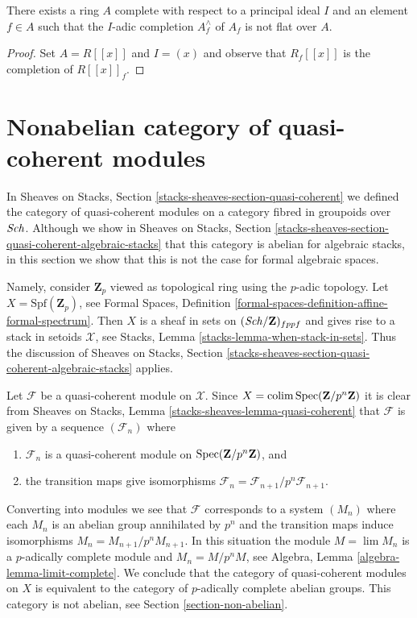 \begin{lemma}
\label{lemma-nonflat-completion-localization}
There exists a ring $A$ complete with respect to a principal ideal $I$
and an element $f \in A$ such that the $I$-adic completion
$A_f^\wedge$ of $A_f$ is not flat over $A$.
\end{lemma}

\begin{proof}
Set $A = R[[x]]$ and $I = (x)$ and observe that $R_f[[x]]$
is the completion of $R[[x]]_f$.
\end{proof}





\section{Nonabelian category of quasi-coherent modules}
\label{section-nonabelian-QCoh}

\noindent
In Sheaves on Stacks, Section \ref{stacks-sheaves-section-quasi-coherent}
we defined the category of quasi-coherent modules on a category fibred in
groupoids over $\mathit{Sch}$. Although we show in
Sheaves on Stacks, Section
\ref{stacks-sheaves-section-quasi-coherent-algebraic-stacks}
that this category is abelian for algebraic stacks, in this
section we show that this is not the case for formal algebraic spaces.

\medskip\noindent
Namely, consider $\mathbf{Z}_p$ viewed as topological ring using
the $p$-adic topology. Let $X = \text{Spf}(\mathbf{Z}_p)$, see
Formal Spaces, Definition
\ref{formal-spaces-definition-affine-formal-spectrum}.
Then $X$ is a sheaf in sets on $(\mathit{Sch}/\mathbf{Z})_{fppf}$
and gives rise to a stack in setoids $\mathcal{X}$, see 
Stacks, Lemma \ref{stacks-lemma-when-stack-in-sets}.
Thus the discussion of Sheaves on Stacks, Section
\ref{stacks-sheaves-section-quasi-coherent-algebraic-stacks}
applies. 

\medskip\noindent
Let $\mathcal{F}$ be a quasi-coherent module on $\mathcal{X}$.
Since $X = \mathop{\mathrm{colim}}\nolimits \mathop{\mathrm{Spec}}(\mathbf{Z}/p^n\mathbf{Z})$ it is clear from
Sheaves on Stacks, Lemma \ref{stacks-sheaves-lemma-quasi-coherent}
that $\mathcal{F}$ is given by a sequence $(\mathcal{F}_n)$ where
\begin{enumerate}
\item $\mathcal{F}_n$ is a quasi-coherent module on
$\mathop{\mathrm{Spec}}(\mathbf{Z}/p^n\mathbf{Z})$, and
\item the transition maps give isomorphisms
$\mathcal{F}_n = \mathcal{F}_{n + 1}/p^n\mathcal{F}_{n + 1}$.
\end{enumerate}
Converting into modules we see that $\mathcal{F}$ corresponds to a
system $(M_n)$ where each $M_n$ is an abelian group annihilated
by $p^n$ and the transition maps induce isomorphisms
$M_n = M_{n + 1}/p^n M_{n + 1}$. In this situation the module
$M = \lim M_n$ is a $p$-adically complete module and $M_n = M/p^n M$, see
Algebra, Lemma \ref{algebra-lemma-limit-complete}.
We conclude that the category of quasi-coherent modules on $X$
is equivalent to the category of $p$-adically complete
abelian groups. This category is not abelian, see
Section \ref{section-non-abelian}.

